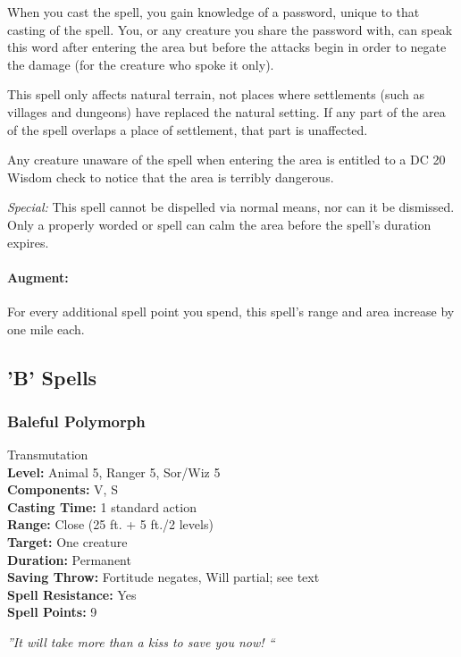 When you cast the spell, you gain knowledge of a password, unique to that casting of the spell. You, or any creature you share the password with, can speak this word after entering the area but before the attacks begin in order to negate the damage (for the creature who spoke it only).

This spell only affects natural terrain, not places where settlements (such as villages and dungeons) have replaced the natural setting. If any part of the area of the spell overlaps a place of settlement, that part is unaffected.

Any creature unaware of the spell when entering the area is entitled to a DC 20 Wisdom check to notice that the area is terribly dangerous.

\emph{Special:} This spell cannot be dispelled via normal means, nor can it be dismissed. Only a properly worded  or  spell can calm the area before the spell's duration expires.

\paragraph{Augment:} For every additional spell point you spend, this spell's range and area increase by one mile each.
\subsection{'B' Spells}
\subsubsection{Baleful Polymorph}
\label{Spell:BalefulPolymorph}
Transmutation
\\ \textbf{Level:} Animal 5, Ranger 5, Sor/Wiz 5
\\ \textbf{Components:} V, S
\\ \textbf{Casting Time:} 1 standard action
\\ \textbf{Range:} Close (25 ft. + 5 ft./2 levels)
\\ \textbf{Target:} One creature
\\ \textbf{Duration:} Permanent
\\ \textbf{Saving Throw:} Fortitude negates, Will partial; see text
\\ \textbf{Spell Resistance:} Yes
\\ \textbf{Spell Points:} 9

\emph{''It will take more than a kiss to save you now! ``}

